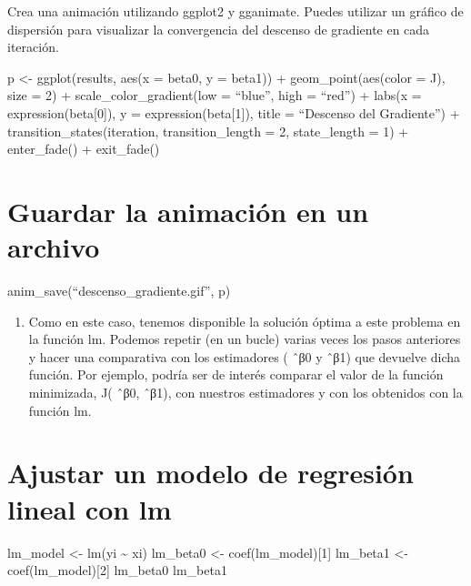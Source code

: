 \documentclass[
]{article}
\providecommand{\tightlist}{%
  \setlength{\itemsep}{0pt}\setlength{\parskip}{0pt}}
\begin{document}
Crea una animación utilizando ggplot2 y gganimate. Puedes utilizar un
gráfico de dispersión para visualizar la convergencia del descenso de
gradiente en cada iteración.

p \textless- ggplot(results, aes(x = beta0, y = beta1)) +
geom\_point(aes(color = J), size = 2) + scale\_color\_gradient(low =
``blue'', high = ``red'') + labs(x = expression(beta{[}0{]}), y =
expression(beta{[}1{]}), title = ``Descenso del Gradiente'') +
transition\_states(iteration, transition\_length = 2, state\_length = 1)
+ enter\_fade() + exit\_fade()

\hypertarget{guardar-la-animaciuxf3n-en-un-archivo}{%
\section{Guardar la animación en un
archivo}\label{guardar-la-animaciuxf3n-en-un-archivo}}

anim\_save(``descenso\_gradiente.gif'', p)

\begin{enumerate}
\def\labelenumi{\arabic{enumi}.}
\setcounter{enumi}{3}
\tightlist
\item
  Como en este caso, tenemos disponible la solución óptima a este
  problema en la función lm. Podemos repetir (en un bucle) varias veces
  los pasos anteriores y hacer una comparativa con los estimadores ( ˆβ0
  y ˆβ1) que devuelve dicha función. Por ejemplo, podría ser de interés
  comparar el valor de la función minimizada, J( ˆβ0, ˆβ1), con nuestros
  estimadores y con los obtenidos con la función lm.
\end{enumerate}

\hypertarget{ajustar-un-modelo-de-regresiuxf3n-lineal-con-lm}{%
\section{Ajustar un modelo de regresión lineal con
lm}\label{ajustar-un-modelo-de-regresiuxf3n-lineal-con-lm}}

lm\_model \textless- lm(yi \textasciitilde{} xi) lm\_beta0 \textless-
coef(lm\_model){[}1{]} lm\_beta1 \textless- coef(lm\_model){[}2{]}
lm\_beta0 lm\_beta1
\end{document}
